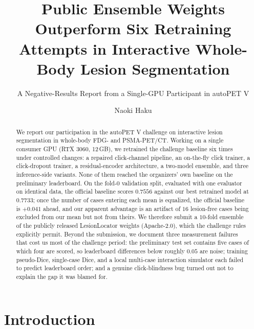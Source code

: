 \documentclass[runningheads]{llncs}
\begin{document}
\title{Public Ensemble Weights Outperform Six Retraining Attempts
in Interactive Whole-Body Lesion Segmentation}
\subtitle{A Negative-Results Report from a Single-GPU Participant in autoPET V}


\author{Naoki Haku}

\maketitle

\begin{abstract}
We report our participation in the autoPET V challenge on interactive lesion
segmentation in whole-body FDG- and PSMA-PET/CT. Working on a single consumer
GPU (RTX 3060, 12\,GB), we retrained the challenge baseline six times under
controlled changes: a repaired click-channel pipeline, an on-the-fly click
trainer, a click-dropout trainer, a residual-encoder architecture, a two-model
ensemble, and three inference-side variants. None of them reached the
organizers' own baseline on the preliminary leaderboard. On the fold-0
validation split, evaluated with one evaluator on identical data, the official
baseline scores $0.7556$ against our best retrained model at $0.7733$; once the
number of cases entering each mean is equalized, the official baseline is
$+0.041$ ahead, and our apparent advantage is an artifact of $16$ lesion-free
cases being excluded from our mean but not from theirs. We therefore submit a
$10$-fold ensemble of the publicly released LesionLocator weights
(Apache-2.0), which the challenge rules explicitly permit. Beyond the
submission, we document three measurement failures that cost us most of the
challenge period: the preliminary test set contains five cases of which four
are scored, so leaderboard differences below roughly $0.05$ are noise; training
pseudo-Dice, single-case Dice, and a local multi-case interaction simulator each
failed to predict leaderboard order; and a genuine click-blindness bug turned
out not to explain the gap it was blamed for.

\end{abstract}

\section{Introduction}
\end{document}

